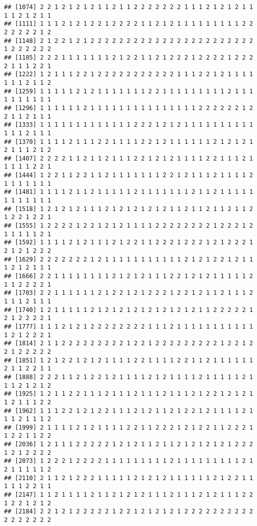 \documentclass[
]{article}
\begin{document}
\begin{verbatim}
## [1074] 2 2 1 2 1 2 1 2 1 1 2 1 1 2 2 2 2 2 2 2 1 1 1 2 1 2 1 2 1 1 1 1 2 1 2 1 1
## [1111] 1 1 1 2 1 2 1 2 2 1 2 2 2 2 1 1 2 1 2 1 1 1 1 1 1 1 1 1 2 2 2 2 2 2 2 1 2
## [1148] 2 1 2 2 1 2 1 2 2 2 2 2 2 2 2 2 2 2 2 2 2 2 2 2 2 2 2 2 2 2 1 2 2 2 2 2 2
## [1185] 2 2 2 1 1 1 1 1 1 1 2 1 2 2 1 1 2 1 2 2 2 1 2 2 2 2 1 2 2 2 2 1 1 1 2 2 1
## [1222] 1 2 1 1 1 2 2 1 2 2 2 2 2 2 2 2 2 2 2 1 1 1 2 2 1 2 1 1 1 1 1 1 1 2 1 1 2
## [1259] 1 1 1 1 1 2 1 2 1 1 1 1 1 1 1 2 2 1 1 1 1 1 1 1 1 1 2 1 1 1 1 1 1 1 1 1 1
## [1296] 1 1 1 1 1 1 2 1 1 1 1 1 1 1 1 1 1 1 1 1 1 1 2 2 2 2 2 2 1 2 2 1 1 2 1 1 1
## [1333] 1 1 1 1 1 1 1 1 1 1 1 1 1 2 2 2 1 2 1 2 1 1 1 1 1 1 1 1 1 1 1 1 1 2 1 1 1
## [1370] 1 1 1 1 2 1 1 1 2 2 1 1 1 1 2 2 1 2 1 1 1 1 1 1 2 1 2 1 2 1 2 1 1 1 2 1 2
## [1407] 2 2 2 2 1 1 2 1 1 2 1 1 1 2 2 1 2 1 2 1 1 1 1 2 2 1 1 1 2 1 1 1 1 1 2 2 1
## [1444] 1 2 2 1 1 2 2 1 1 2 1 1 1 1 1 1 1 2 2 1 2 1 1 1 2 1 1 1 1 2 1 1 1 1 1 1 1
## [1481] 1 1 1 1 2 1 1 2 1 1 1 1 1 2 1 1 1 1 1 1 1 2 1 1 2 1 1 1 1 1 1 1 1 1 1 1 1
## [1518] 1 2 1 2 1 2 1 1 1 2 1 2 1 2 1 2 1 2 1 1 2 1 1 2 1 1 2 1 1 2 1 2 2 1 2 2 1
## [1555] 1 2 2 2 2 1 2 2 1 2 1 2 1 1 1 1 2 2 2 2 2 2 2 2 1 2 2 2 1 2 1 1 1 1 1 2 1
## [1592] 1 1 1 1 2 1 2 1 1 1 2 1 2 2 1 1 2 2 2 1 2 2 2 1 2 1 2 2 2 1 2 1 2 1 2 2 2
## [1629] 2 2 2 2 2 2 2 1 2 1 1 1 1 1 1 1 1 1 1 1 2 1 2 1 2 2 1 2 1 1 1 2 1 2 1 1 1
## [1666] 2 2 1 1 1 1 1 1 1 1 2 1 2 1 2 1 1 1 2 2 1 2 1 2 1 1 1 1 1 2 1 1 2 2 2 2 1
## [1703] 2 2 1 1 1 1 1 1 2 1 2 2 1 2 1 2 2 2 1 2 2 1 2 1 1 2 1 1 1 2 1 1 1 2 1 1 1
## [1740] 1 2 1 1 1 1 1 2 1 2 1 2 1 2 1 2 1 2 1 2 1 2 1 1 2 2 2 2 2 1 2 1 2 2 2 2 1
## [1777] 1 1 1 2 1 2 1 2 2 2 2 2 2 2 2 1 1 1 2 1 1 1 1 1 1 1 1 1 1 1 1 2 1 2 2 2 1
## [1814] 2 1 1 2 2 2 2 2 2 2 2 2 1 2 2 1 2 2 2 2 2 2 2 2 2 1 2 2 1 2 2 1 2 2 2 2 2
## [1851] 1 2 1 2 2 1 2 1 2 1 1 1 1 2 2 1 1 1 1 2 2 1 1 2 1 1 1 1 1 1 2 1 1 2 2 1 1
## [1888] 2 2 2 1 1 2 1 2 2 1 2 1 1 1 1 2 1 2 1 1 1 1 2 1 1 1 1 1 2 1 1 1 2 1 2 1 2
## [1925] 1 2 1 1 2 2 1 1 1 2 1 1 1 2 1 1 1 2 1 1 1 2 1 2 2 1 2 1 2 1 1 2 1 1 1 2 2
## [1962] 1 1 1 2 2 1 2 1 2 2 1 1 1 2 1 2 1 1 2 1 2 2 1 2 1 1 1 1 2 1 1 1 2 1 1 1 2
## [1999] 2 1 1 1 1 2 1 2 1 1 1 1 2 2 1 1 2 2 2 1 2 1 2 2 1 1 2 2 2 1 1 2 2 1 1 2 2
## [2036] 1 2 1 1 1 2 2 2 2 2 1 2 1 2 1 1 2 1 1 2 1 2 1 2 1 2 1 2 2 2 1 2 1 2 2 2 2
## [2073] 1 2 2 2 1 2 2 2 2 1 1 1 1 1 1 1 1 1 2 1 1 1 1 1 1 1 1 1 2 1 2 1 1 1 1 1 2
## [2110] 2 1 1 2 1 2 2 2 1 1 1 1 1 2 1 2 1 2 1 1 1 1 1 1 2 1 2 2 1 1 1 1 1 2 2 1 1
## [2147] 1 1 2 1 1 1 1 2 1 1 2 1 2 1 2 1 1 1 2 1 1 1 2 1 2 1 1 1 2 2 1 2 2 1 2 1 2
## [2184] 2 2 1 2 1 2 2 2 2 2 1 2 2 1 2 1 2 1 2 1 2 2 2 2 2 2 2 2 2 2 2 2 2 2 2 2 2

\end{verbatim}
\end{document}
